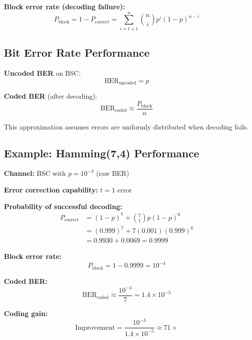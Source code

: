 \textbf{Block error rate (decoding failure):}
\begin{equation}
P_{\text{block}} = 1 - P_{\text{correct}} = \sum_{i=t+1}^{n} \binom{n}{i} p^i (1-p)^{n-i}
\end{equation}

\subsection{Bit Error Rate Performance}

\textbf{Uncoded BER} on BSC:
\begin{equation}
\text{BER}_{\text{uncoded}} = p
\end{equation}

\textbf{Coded BER} (after decoding):
\begin{equation}
\text{BER}_{\text{coded}} \approx \frac{P_{\text{block}}}{n}
\end{equation}

This approximation assumes errors are uniformly distributed when decoding fails.

\subsection{Example: Hamming(7,4) Performance}

\textbf{Channel:} BSC with $p = 10^{-3}$ (raw BER)

\textbf{Error correction capability:} $t = 1$ error

\textbf{Probability of successful decoding:}
\begin{equation}
\begin{aligned}
P_{\text{correct}} &= (1-p)^7 + \binom{7}{1} p (1-p)^6 \\
&= (0.999)^7 + 7(0.001)(0.999)^6 \\
&= 0.9930 + 0.0069 = 0.9999
\end{aligned}
\end{equation}

\textbf{Block error rate:}
\begin{equation}
P_{\text{block}} = 1 - 0.9999 = 10^{-4}
\end{equation}

\textbf{Coded BER:}
\begin{equation}
\text{BER}_{\text{coded}} \approx \frac{10^{-4}}{7} = 1.4 \times 10^{-5}
\end{equation}

\textbf{Coding gain:}
\begin{equation}
\text{Improvement} = \frac{10^{-3}}{1.4 \times 10^{-5}} \approx 71\times
\end{equation}

